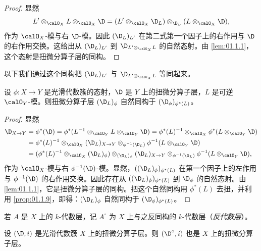 \begin{proof}
显然
$$L'\otimes_{\calO_X}L\otimes_{\calO_X}\D=(L'\otimes_{\calO_X}\D_L)\otimes_{\D_L}(L\otimes_{\calO_X}\D),$$
作为 $\calO_X$-模与右 $\D$-模。因此 $(\D_L)_{L'}$ 在第二式第一个因子上的右作用与 $\D$ 的右作用交换。这给出从 $(\D_L)_{L'}$ 到 $\D_{L'\otimes_{\calO_X}L}$ 的自然态射。由 \ref{lem:01.1.1}，这个态射是扭微分算子层的同构。
\end{proof}

以下我们通过这个同构把 $(\D_L)_{L'}$ 与 $\D_{L'\otimes_{\calO_X}L}$ 等同起来。

\begin{proposition}\label{prop:01.1.10}
设 $\phi:X\to Y$ 是光滑代数簇的态射，$\D$ 是 $Y$ 上的扭微分算子层，$L$ 是可逆 $\calO_Y$-模。则扭微分算子层 $(\D_L)_\phi$ 自然同构于 $(\D_\phi)_{\phi^*(L)}$。
\end{proposition}

\begin{proof}
显然
\begin{align*}
\D_{X\to Y}&=\phi^*(\D)=\phi^*(L^{-1}\otimes_{\calO_Y}L\otimes_{\calO_Y}\D)=\phi^*(L)^{-1}\otimes_{\calO_X}\phi^*(L\otimes_{\calO_Y}\D)\\
&=\phi^*(L)^{-1}\otimes_{\calO_X}(\D_L)_{X\to Y}\otimes_{\phi^{-1}(\D_L)}\phi^{-1}(L\otimes_{\calO_Y}\D)\\
&=(\phi^*(L)^{-1}\otimes_{\calO_X}(\D_L)_\phi)\otimes_{(\D_L)_\phi}(\D_L)_{X\to Y}\otimes_{\phi^{-1}(\D_L)}\phi^{-1}(L\otimes_{\calO_Y}\D),
\end{align*}
作为 $\calO_X$-模与右 $\phi^{-1}(\D)$-模。显然，$((\D_L)_\phi)_{\phi^*(L)}$ 在第一个因子上的左作用与 $\phi^{-1}(\D)$ 的右作用交换。因此存在从 $((\D_L)_\phi)_{\phi^*(L)}$ 到 $\D_\phi$ 的自然态射。由 \ref{lem:01.1.1}，它是扭微分算子层的同构。把这个自然同构用 $\phi^*(L)$ 去扭，并利用 \ref{prop:01.1.9}，即得：$(\D_L)_\phi$ 自然同构于 $(\D_\phi)_{\phi^*(L)}$。
\end{proof}

若 $A$ 是 $X$ 上的 $k$-代数层，记 $A^\circ$ 为 $X$ 上与之反同构的 $k$-代数层（\emph{反代数层}）。

\begin{proposition}\label{prop:01.1.11}
设 $(\D,i)$ 是光滑代数簇 $X$ 上的扭微分算子层。则 $(\D^\circ,i)$ 也是 $X$ 上的扭微分算子层。
\end{proposition}

